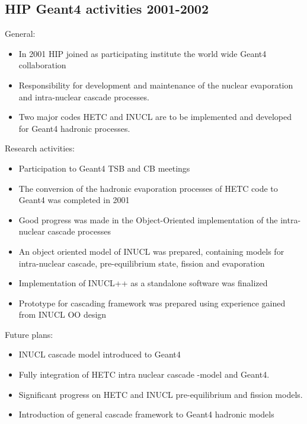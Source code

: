 \begin{appendix}
\subsection{HIP Geant4 activities 2001-2002}

General:
\begin{itemize}
\item In 2001 HIP joined as participating institute the world wide Geant4 collaboration
\item Responsibility for development and maintenance of the nuclear evaporation and intra-nuclear cascade processes. 
\item Two major codes HETC and INUCL are to be implemented and developed for Geant4 hadronic processes.
\end{itemize}

Research activities:
\begin{itemize}
\item Participation to Geant4 TSB and CB meetings
\item The conversion of the hadronic evaporation processes of HETC code to Geant4 was completed in 2001
\item Good progress was made in the Object-Oriented implementation of the intra-nuclear cascade processes

\item An object oriented model of INUCL was prepared, containing models for intra-nuclear cascade, pre-equilibrium state, fission and evaporation 
\item Implementation of  INUCL++ as a standalone software was finalized

\item Prototype for cascading framework was prepared using experience gained from INUCL OO design
\end{itemize}

Future plans:
\begin{itemize}
\item INUCL cascade model introduced to Geant4
\item Fully integration of HETC intra nuclear cascade -model and Geant4.
\item Significant progress on HETC and INUCL pre-equilibrium and fission models.
\item Introduction of general cascade framework to Geant4 hadronic models
\end{itemize}


\end{appendix}
